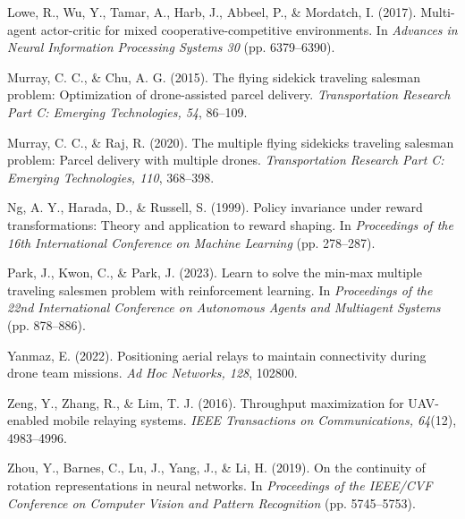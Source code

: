 \documentclass[12pt]{article}
\begin{document}
\noindent Lowe, R., Wu, Y., Tamar, A., Harb, J., Abbeel, P., \& Mordatch, I. (2017). Multi-agent
actor-critic for mixed cooperative-competitive environments. In \textit{Advances in Neural
Information Processing Systems 30} (pp. 6379--6390).

\noindent Murray, C. C., \& Chu, A. G. (2015). The flying sidekick traveling salesman problem:
Optimization of drone-assisted parcel delivery. \textit{Transportation Research Part C: Emerging
Technologies, 54}, 86--109.

\noindent Murray, C. C., \& Raj, R. (2020). The multiple flying sidekicks traveling salesman
problem: Parcel delivery with multiple drones. \textit{Transportation Research Part C: Emerging
Technologies, 110}, 368--398.

\noindent Ng, A. Y., Harada, D., \& Russell, S. (1999). Policy invariance under reward
transformations: Theory and application to reward shaping. In \textit{Proceedings of the 16th
International Conference on Machine Learning} (pp. 278--287).

\noindent Park, J., Kwon, C., \& Park, J. (2023). Learn to solve the min-max multiple traveling
salesmen problem with reinforcement learning. In \textit{Proceedings of the 22nd International
Conference on Autonomous Agents and Multiagent Systems} (pp. 878--886).

\noindent Yanmaz, E. (2022). Positioning aerial relays to maintain connectivity during drone team
missions. \textit{Ad Hoc Networks, 128}, 102800.

\noindent Zeng, Y., Zhang, R., \& Lim, T. J. (2016). Throughput maximization for UAV-enabled
mobile relaying systems. \textit{IEEE Transactions on Communications, 64}(12), 4983--4996.

\noindent Zhou, Y., Barnes, C., Lu, J., Yang, J., \& Li, H. (2019). On the continuity of rotation
representations in neural networks. In \textit{Proceedings of the IEEE/CVF Conference on Computer
Vision and Pattern Recognition} (pp. 5745--5753).
\end{document}
